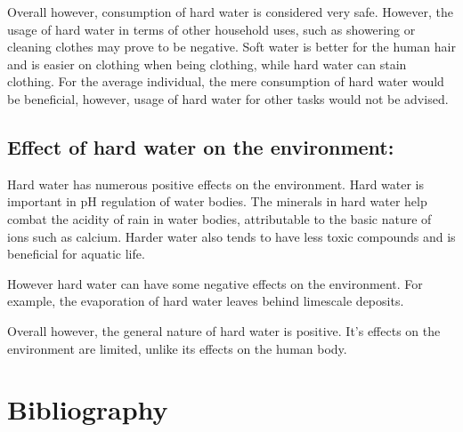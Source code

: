 \documentclass[11pt, a4]{article}
\begin{document}
			Overall however, consumption of hard water is considered very safe. However, the usage of hard water in terms of other household uses, such as showering or cleaning clothes may prove to be negative. Soft water is better for the human hair and is easier on clothing when being clothing, while hard water can stain clothing. For the average individual, the mere consumption of hard water would be beneficial, however, usage of hard water for other tasks would not be advised.

		\subsection{Effect of hard water on the environment:}
			
			Hard water has numerous positive effects on the environment. Hard water is important in pH regulation of water bodies. The minerals in hard water help combat the acidity of rain in water bodies, attributable to the basic nature of ions such as calcium. Harder water also tends to have less toxic compounds and is beneficial for aquatic life. 

			However hard water can have some negative effects on the environment. For example, the evaporation of hard water leaves behind limescale deposits. 
			
			Overall however, the general nature of hard water is positive. It's effects on the environment are limited, unlike its effects on the human body.
			\newpage
	\section{Bibliography}
	
		
\end{document}
